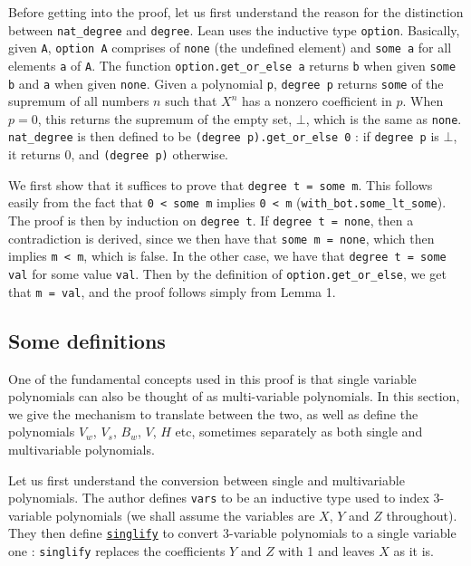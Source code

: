 \documentclass{article}
\theoremstyle{definition}
\theoremstyle{remark}
\begin{document}
Before getting into the proof, let us first understand the reason for the distinction between \texttt{nat\_degree} and \texttt{degree}. Lean uses the inductive type \texttt{option}. Basically, given \texttt{A}, 
\texttt{option A} comprises of \texttt{none} (the undefined element) and \texttt{some a} for all elements \texttt{a} of \texttt{A}. The function \texttt{option.get\_or\_else a} returns \texttt{b} when given 
\texttt{some b} and \texttt{a} when given \texttt{none}. Given a polynomial \texttt{p}, \texttt{degree p} returns \texttt{some} of the supremum of all numbers $n$ such that $X^n$ has 
a nonzero coefficient in $p$. When $p = 0$, this returns the supremum of the empty set, $\bot$, which is the same as \texttt{none}. \texttt{nat\_degree} is then defined to be \texttt{(degree p).get\_or\_else 0} : 
if \texttt{degree p} is $\bot$, it returns 0, and \texttt{(degree p)} otherwise.

We first show that it suffices to prove that \texttt{degree t = some m}. This follows easily from the fact that \texttt{0 < some m} implies \texttt{0 < m} (\texttt{with\_bot.some\_lt\_some}).
The proof is then by induction on \texttt{degree t}. 
If \texttt{degree t = none}, then a contradiction is derived, since we then have that \texttt{some m = none}, which then implies \texttt{m < m}, which is false. In the other case, we have that \texttt{degree t = some val} 
for some value \texttt{val}. Then by the definition of \texttt{option.get\_or\_else}, we get that \texttt{m = val}, and the proof follows simply from Lemma 1.

\subsection{Some definitions}
One of the fundamental concepts used in this proof is that single variable polynomials can also be thought of as multi-variable polynomials. In this section, we give the mechanism to translate between the two, as well as 
define the polynomials $V_w$, $V_s$, $B_w$, $V$, $H$ etc, sometimes separately as both single and multivariable polynomials. 

Let us first understand the conversion between single and multivariable polynomials. The author defines \texttt{vars} to be an inductive type used to index 3-variable polynomials (we shall assume the variables are $X$, $Y$ 
and $Z$ throughout). They then define \href{https://github.com/BoltonBailey/formal-snarks-project/blob/7fd9cd122f5887f88f6a706b4f2a68a7153c7381/src/snarks/babysnark/knowledge_soundness.lean#L139}{\texttt{singlify}} to 
convert 3-variable polynomials to a single variable one : \texttt{singlify} replaces the coefficients $Y$ and $Z$ with 1 and leaves $X$ as it is.
\end{document}
